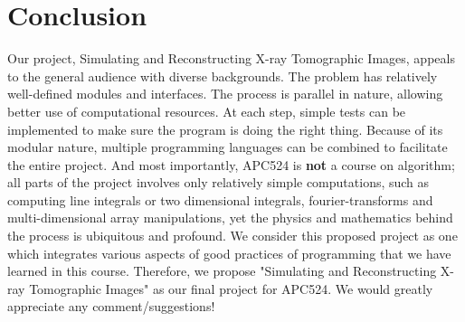 \documentclass[11]{article}
\begin{document}
\section{Conclusion}
Our project, Simulating and Reconstructing X-ray Tomographic Images, appeals to the general audience with diverse backgrounds. The problem has relatively well-defined modules and interfaces. The process is parallel in nature, allowing better use of computational resources. At each step, simple tests can be implemented to make sure the program is doing the right thing. Because of its modular nature, multiple programming languages can be combined to facilitate the entire project. And most importantly, APC524 is \textbf{not} a course on algorithm; all parts of the project involves only relatively simple computations, such as computing line integrals or two dimensional integrals, fourier-transforms and multi-dimensional array manipulations, yet the physics and mathematics behind the process is ubiquitous and profound. We consider this proposed project as one which integrates various aspects of good practices of programming that we have learned in this course. Therefore, we propose "Simulating and Reconstructing X-ray Tomographic Images" as our final project for APC524. We would greatly appreciate any comment/suggestions! 
\end{document}
